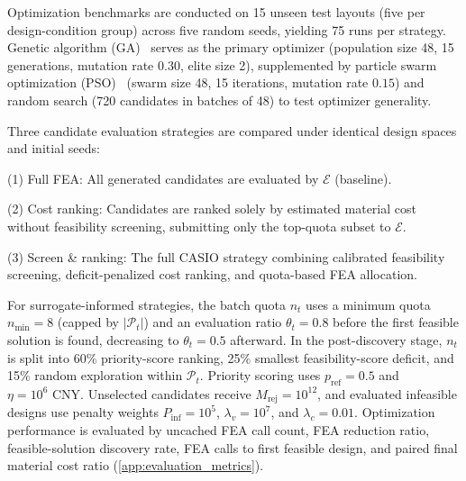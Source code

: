 Optimization benchmarks are conducted on 15 unseen test layouts (five per design-condition group) across five random seeds, yielding 75 runs per strategy. Genetic algorithm (GA)~\cite{Goldberg1989} serves as the primary optimizer (population size 48, 15 generations, mutation rate $0.30$, elite size 2), supplemented by particle swarm optimization (PSO)~\cite{Kennedy1995PSO} (swarm size 48, 15 iterations, mutation rate $0.15$) and random search (720 candidates in batches of 48) to test optimizer generality.

Three candidate evaluation strategies are compared under identical design spaces and initial seeds:

(1) Full FEA: All generated candidates are evaluated by $\mathcal{E}$ (baseline).

(2) Cost ranking: Candidates are ranked solely by estimated material cost without feasibility screening, submitting only the top-quota subset to $\mathcal{E}$.

(3) Screen \& ranking: The full CASIO strategy combining calibrated feasibility screening, deficit-penalized cost ranking, and quota-based FEA allocation.

For surrogate-informed strategies, the batch quota $n_t$ uses a minimum quota $n_{\min}=8$ (capped by $|\mathcal{P}_t|$) and an evaluation ratio $\theta_t = 0.8$ before the first feasible solution is found, decreasing to $\theta_t = 0.5$ afterward. In the post-discovery stage, $n_t$ is split into 60\% priority-score ranking, 25\% smallest feasibility-score deficit, and 15\% random exploration within $\mathcal{P}_t$. Priority scoring uses $p_{\mathrm{ref}}=0.5$ and $\eta=10^6\text{ CNY}$. Unselected candidates receive $M_{\mathrm{rej}}=10^{12}$, and evaluated infeasible designs use penalty weights $P_{\mathrm{inf}}=10^5$, $\lambda_v=10^7$, and $\lambda_c=0.01$. Optimization performance is evaluated by uncached FEA call count, FEA reduction ratio, feasible-solution discovery rate, FEA calls to first feasible design, and paired final material cost ratio (\ref{app:evaluation_metrics}).
